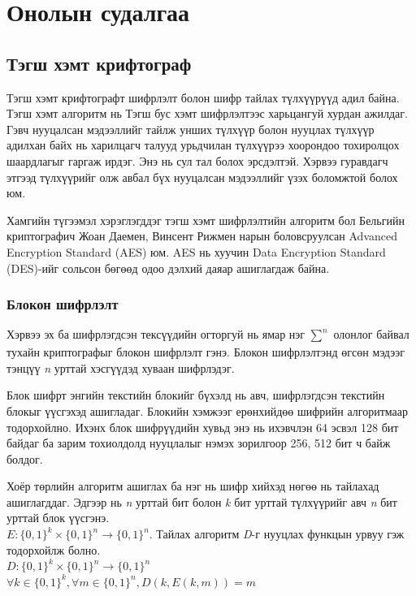 \chapter{Онолын судалгаа}
\section{Тэгш хэмт крифтограф}
Тэгш хэмт крифтографт шифрлэлт болон шифр тайлах түлхүүрүүд адил байна. Тэгш хэмт алгоритм нь Тэгш бус хэмт шифрлэлтээс харьцангуй хурдан ажилдаг. Гэвч нууцалсан мэдээллийг тайлж унших түлхүүр болон нууцлах түлхүүр адилхан байх нь харилцагч талууд урьдчилан түлхүүрээ хоорондоо тохиролцох шаардлагыг гаргаж ирдэг. Энэ нь сул тал болох эрсдэлтэй. Хэрвээ гуравдагч этгээд түлхүүрийг олж авбал бүх нууцалсан мэдээллийг үзэх боломжтой болох юм.

Хамгийн түгээмэл хэрэглэгддэг тэгш хэмт шифрлэлтийн алгоритм бол Бельгийн криптографич Жоан Даемен, Винсент Рижмен нарын боловсруулсан Advanced Encryption Standard (AES) юм. AES нь хуучин Data Encryption Standard (DES)-ийг сольсон бөгөөд одоо дэлхий даяар ашиглагдаж байна.\cite{AES}
\subsection{Блокон шифрлэлт}

Хэрвээ эх ба шифрлэгдсэн тексүүдийн огторгуй нь ямар нэг $\sum_{}^{n}$ олонлог байвал тухайн криптографыг блокон шифрлэлт гэнэ. Блокон шифрлэлтэнд өгсөн мэдээг тэнцүү \textit{n} урттай хэсгүүдэд хуваан шифрлэдэг.\cite{intro_crypo}

Блок шифрт энгийн текстийн блокийг бүхэлд нь авч, шифрлэгдсэн текстийн блокыг үүсгэхэд ашигладаг. Блокийн хэмжээг ерөнхийдөө шифрийн алгоритмаар тодорхойлно. Ихэнх блок шифрүүдийн хувьд энэ нь ихэвчлэн 64 эсвэл 128 бит байдаг ба зарим тохиолдолд нууцлалыг нэмэх зорилгоор 256, 512 бит ч байж болдог.


Хоёр төрлийн алгоритм ашиглах ба нэг нь шифр хийхэд нөгөө нь тайлахад ашиглагддаг. Эдгээр нь \textit{n} урттай бит болон \textit{k} бит урттай түлхүүрийг авч \textit{n} бит урттай блок үүсгэнэ.\\$E: \{0,1\}^k \times \{0,1\}^n \rightarrow \{0,1\}^n$.
Тайлах алгоритм \textit{D}-г нууцлах функцын урвуу гэж тодорхойлж болно.\\ $D: \{0,1\}^k \times \{0,1\}^n \rightarrow \{0,1\}^n$\\
$\forall k \in \{0,1\}^k, \forall m \in \{0,1\}^n, D(k, E(k, m)) = m$\\
\cite{modern_crypto}

